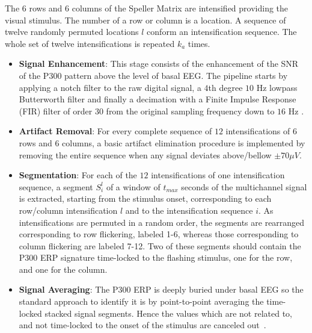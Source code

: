 \documentclass[utf8]{frontiersSCNS} %
\begin{document}

The $6$ rows and $6$ columns of the Speller Matrix are intensified providing the visual stimulus.  The number of a row or column is a location. A sequence of twelve randomly permuted locations $l$ conform an intensification sequence. The whole set of twelve intensifications is repeated $k_a$ times.


\begin{itemize}
\item \textbf{Signal Enhancement}: This stage consists of the enhancement of the SNR of the P300 pattern above the level of basal EEG. The pipeline starts by applying a notch filter to the raw digital signal, a $4$th degree $10$ Hz lowpass Butterworth filter and finally a decimation with a Finite Impulse Response (FIR) filter of order $30$ from the original sampling frequency down to $16$ Hz \citep{Krusienski2006}.
\item \textbf{Artifact Removal}: For every complete sequence of $12$ intensifications of $6$ rows and $6$ columns, a basic artifact elimination procedure is implemented by removing the entire sequence when any signal deviates above/bellow $ \pm 70 \mu V $.
\item \textbf{Segmentation}: For each of the $12$ intensifications of one intensification sequence,  a segment $S_{i}^l$  of a window of $t_{max} $ seconds of the multichannel signal is extracted, starting from the stimulus onset, corresponding to each row/column intensification $l$ and to the intensification sequence $i$. As intensifications are permuted in a random order, the segments are rearranged corresponding to row flickering, labeled 1-6, whereas those corresponding to column flickering are labeled 7-12.  Two of these segments should contain the P300 ERP signature time-locked to the flashing stimulus, one for the row, and one for the column.
\item \textbf{Signal Averaging}: \label{Average}  The P300 ERP is deeply buried under basal EEG so the standard approach to identify it is by point-to-point averaging the time-locked stacked signal segments.  Hence the values which are not related to, and not time-locked to the onset of the stimulus are canceled out~\citep{Liang2008}.  


\end{itemize}
\end{document}

